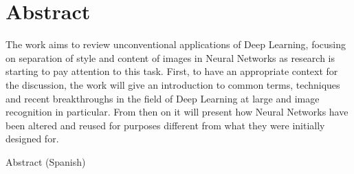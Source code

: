 %
\chapter*{Abstract}
\label{sec:abstract}
\vspace*{-10mm}

The work aims to review unconventional applications of Deep Learning, focusing on separation of style and content of images in Neural Networks as research is starting to pay attention to this task. First, to have an appropriate context for the discussion, the work will give an introduction to common terms, techniques and recent breakthroughs in the field of Deep Learning at large and image recognition in particular. From then on it will present how Neural Networks have been altered and reused for purposes different from what they were initially designed for.

\vspace*{20mm}

{Abstract (Spanish)}\label{sec:abstract-diff} \\

